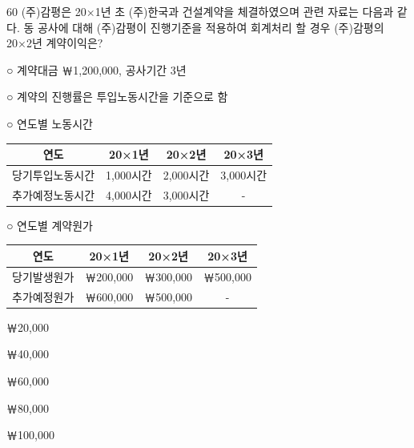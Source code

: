 \begin{question}{60}
(주)감평은 20×1년 초 (주)한국과 건설계약을 체결하였으며 관련 자료는 다음과 같다. 동 공사에 대해 (주)감평이 진행기준을 적용하여 회계처리 할 경우 (주)감평의 20×2년 계약이익은?
\begin{framedtext}
○ 계약대금 ￦1,200,000, 공사기간 3년 \par
○ 계약의 진행률은 투입노동시간을 기준으로 함 \par
○ 연도별 노동시간 \par
{\small\centering\begin{tabular}{|c|c|c|c|}\hline
연도 & 20×1년 & 20×2년 & 20×3년 \\\hline
당기투입노동시간 & 1,000시간 & 2,000시간 & 3,000시간 \\\hline
추가예정노동시간 & 4,000시간 & 3,000시간 & - \\\hline
\end{tabular}\par}
○ 연도별 계약원가 \par
{\small\centering\begin{tabular}{|c|c|c|c|}\hline
연도 & 20×1년 & 20×2년 & 20×3년 \\\hline
당기발생원가 & ￦200,000 & ￦300,000 & ￦500,000 \\\hline
추가예정원가 & ￦600,000 & ￦500,000 & - \\\hline
\end{tabular}\par}
\end{framedtext}
\begin{choices}
  \item ￦20,000
  \item ￦40,000
  \item ￦60,000
  \item ￦80,000
  \item ￦100,000
\end{choices}
\end{question}
